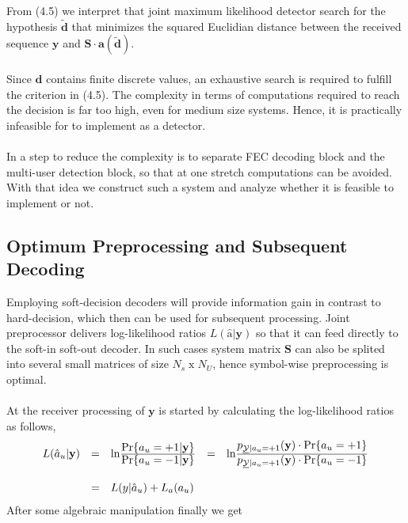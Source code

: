 From (4.5) we interpret that joint maximum likelihood detector search for the hypothesis $\mathrm{\tilde{\mathbf{d}}}$ that minimizes the squared Euclidian distance between the received sequence $\mathrm{\mathbf{y}}$ and $\mathrm{\mathbf{S\cdot a(\tilde{d})}}$. \\ \\
Since $\mathrm{\mathbf{d}}$ contains finite discrete values, an exhaustive search is required to fulfill the criterion in (4.5). The complexity in terms of computations required to reach the decision is far too high, even for medium size systems. Hence, it is practically infeasible for to implement as a detector. \\ \\
In a step to reduce the complexity is to separate FEC decoding block and the multi-user detection block, so that at one stretch computations can be avoided. With that idea we construct such a system and analyze whether it is feasible to implement or not.
\subsection{Optimum Preprocessing and Subsequent Decoding}
Employing soft-decision decoders will provide information gain in contrast to hard-decision, which then can be used for subsequent processing. Joint preprocessor delivers log-likelihood ratios $L(\mathrm{\hat{a}}\vert \mathrm{\mathbf{y}})$ so that it can feed directly to the soft-in soft-out decoder. In such cases system matrix $\mathrm{\mathbf{S}}$ can also be splited into several small matrices of size $N_s\;\mathrm{x}\;N_U$, hence symbol-wise preprocessing is optimal. \\ \\
At the receiver processing of $\mathrm{\mathbf{y}}$ is started by calculating the log-likelihood ratios as follows,
\begin{eqnarray}
\begin{array}{lllll}
L(\hat{a}_u\vert \mathrm{\mathbf{y}})&=&\mathrm{ln}\frac{\hbox{$\mathrm{Pr}\{a_u=+1 \vert \mathrm{\mathbf{y}}\}$}}{\hbox{$\mathrm{Pr}\{a_u=-1 \vert \mathrm{\mathbf{y}}\}$}}&=&\mathrm{ln}\frac{\hbox{$p_{\underline{\mathcal{Y}}\vert a_u=+1}(\mathrm{\mathbf{y}})\cdot \mathrm{Pr}\{a_u=+1\}$}}{\hbox{$p_{\underline{\mathcal{Y}}\vert a_u=+1}(\mathrm{\mathbf{y}})\cdot \mathrm{Pr}\{a_u=-1\}$}} \\ \\
&=&L(y\vert \hat{a}_u)+L_a(a_u)
\end{array}
\end{eqnarray}
After some algebraic manipulation finally we get

